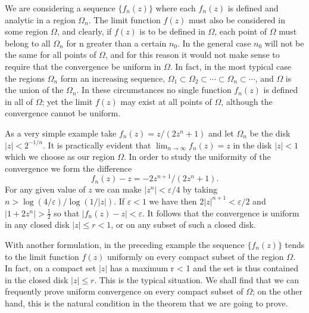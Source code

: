 We are considering a sequence $\{f_{n}(z)\}$ where each $f_{n}(z)$ is defined and analytic in a region $\Omega_{n}$. The limit function $f(z)$ must also be considered in some region $\Omega$, and clearly, if $f(z)$ is to be defined in $\Omega$, each point of $\Omega$ must belong to all $\Omega_{n}$ for n greater than a certain $n_{0}$. In the general case $n_{0}$ will not be the same for all points of $\Omega$, and for this reason it would not make sense to require that the convergence be uniform in $\Omega$. In fact, in the most typical case the regions $\Omega_{n}$ form an increasing sequence, $\Omega_{1} \subset \Omega_{2} \subset \cdots \subset \Omega_{n} \subset \cdots$, and $\Omega$ is the union of the $\Omega_{n}$. In these circumstances no single function $f_{n}(z)$ is defined in all of $\Omega$; yet the limit $f(z)$ may exist at all points of $\Omega$, although the convergence cannot be uniform.

As a very simple example take $f_{n}(z) = z/(2z^{n} + 1)$ and let $\Omega_{n}$ be the disk $|z| < 2^{-1/n}$. It is practically evident that $\lim_{n \to \infty} f_{n}(z) = z$ in the disk $|z| < 1$ which we choose as our region $\Omega$. In order to study the uniformity of the convergence we form the difference
\begin{equation*}
f _ {n} (z) - z = - 2 z ^ {n + 1} / (2 z ^ {n} + 1).
\end{equation*}
For any given value of $z$ we can make $|z^n| < \varepsilon / 4$ by taking $n > \log (4 / \varepsilon) / \log (1 / |z|)$. If $\varepsilon < 1$ we have then $2|z|^{n+1} < \varepsilon / 2$ and $|1 + 2z^n| > \frac{1}{2}$ so that $|f_n(z) - z| < \varepsilon$. It follows that the convergence is uniform in any closed disk $|z| \leq r < 1$, or on any subset of such a closed disk.

With another formulation, in the preceding example the sequence $\{f_{n}(z)\}$ tends to the limit function $f(z)$ uniformly on every compact subset of the region $\Omega$. In fact, on a compact set $|z|$ has a maximum r < 1 and the set is thus contained in the closed disk $|z| \leq r$. This is the typical situation. We shall find that we can frequently prove uniform convergence on every compact subset of $\Omega$; on the other hand, this is the natural condition in the theorem that we are going to prove.

